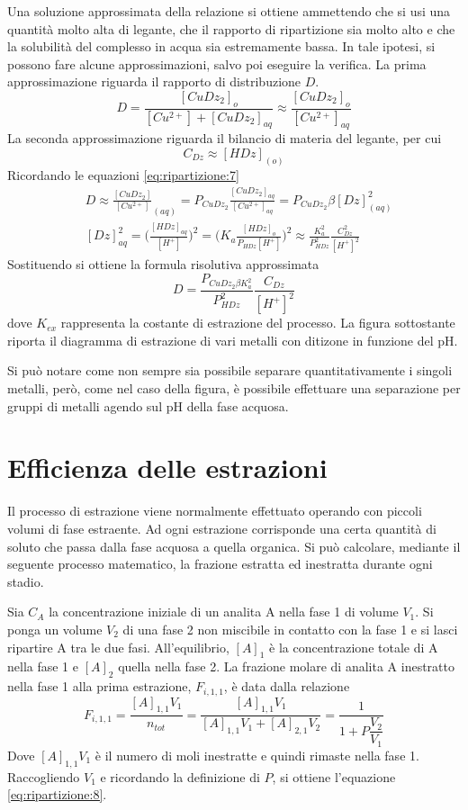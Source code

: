 Una soluzione approssimata della relazione si ottiene ammettendo che si usi una quantità molto alta di legante, che il rapporto di ripartizione sia molto alto e che la solubilità del complesso in acqua sia estremamente bassa. In tale ipotesi, si possono fare alcune approssimazioni, salvo poi eseguire la verifica. La prima approssimazione riguarda il rapporto di distribuzione $D$.
\[
D = \frac{[CuDz_2]_o}{[Cu^{2+}] + [CuDz_2]_{aq}} \approx \frac{[CuDz_2]_o}{[Cu^{2+}]_{aq}}
\]
La seconda approssimazione riguarda il bilancio di materia del legante, per cui
\[
C_{Dz} \approx [HDz]_{(o)}
\]
Ricordando le equazioni \ref{eq:ripartizione:7}
\begin{align*}
& D \approx \frac{[CuDz_2]}{[Cu^{2+}]}_{(aq)} = P_{CuDz_2} \frac{[CuDz_2]_{aq}}{[Cu^{2+}]_{aq}} = P_{CuDz_2} \beta [Dz]^2_{(aq)}\\
&[Dz]^2_{aq} = \biggl(\frac{[HDz]_{aq}}{[H^+]}\biggr)^2 = \biggl(K_a \frac{[HDz]_o}{P_{HDz} [H^+]}\biggr)^2 \approx \frac{K_a^2}{P_{HDz}^2} \frac{C_{Dz}^2}{[H^+]^2}
\end{align*}
Sostituendo si ottiene la formula risolutiva approssimata
\[
D = \frac{P_{CuDz_2 \beta K_a^2}}{P_{HDz}^2} \frac{C_{Dz}}{[H^+]^2}
\]
dove $K_{ex}$ rappresenta la costante di estrazione del processo.
La figura sottostante riporta il diagramma di estrazione di vari metalli con ditizone in funzione del pH.


Si può notare come non sempre sia possibile separare quantitativamente i singoli metalli, però, come nel caso della figura, è possibile effettuare una separazione per gruppi di metalli agendo sul pH della fase acquosa.

\section{Efficienza delle estrazioni}
Il processo di estrazione viene normalmente effettuato operando con piccoli volumi di fase estraente.
Ad ogni estrazione corrisponde una certa quantità di soluto che passa dalla fase acquosa a quella organica. Si può calcolare, mediante il seguente processo matematico, la frazione estratta ed inestratta durante ogni stadio.

Sia $C_A$ la concentrazione iniziale di un analita A nella fase 1 di volume $V_1$. Si ponga un volume $V_2$ di una fase 2 non miscibile in contatto con la fase 1 e si lasci ripartire A tra le due fasi.
All'equilibrio, $[A]_1$ è la concentrazione totale di A nella fase 1 e $[A]_2$ quella nella fase 2.
La frazione molare di analita A inestratto nella fase 1 alla prima estrazione, $F_{i,1,1}$, è data dalla relazione
\begin{equation} \label{eq:ripartizione:8}
F_{i,1,1} = \frac{[A]_{1,1} V_1}{n_{tot}} = \frac{[A]_{1,1} V_1}{[A]_{1,1} V_1 + [A]_{2,1} V_2} = \dfrac{1}{1 + P \dfrac{V_2}{V_1}}
\end{equation}
Dove $[A]_{1,1} V_1$ è il numero di moli inestratte e quindi rimaste nella fase 1. Raccogliendo $V_1$ e ricordando la definizione di $P$, si ottiene l'equazione \ref{eq:ripartizione:8}.

